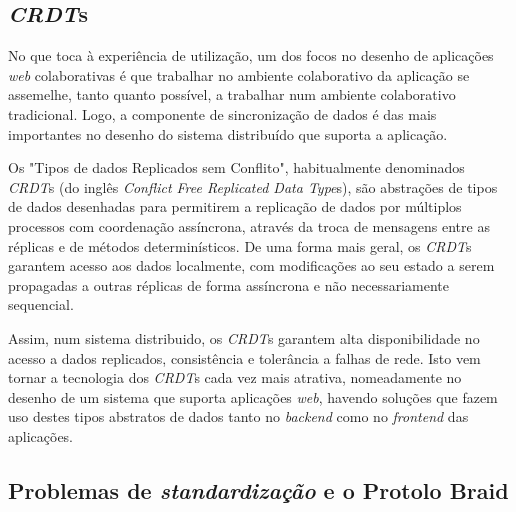 \documentclass[runningheads]{llncs}
\begin{document}


        \subsection{{\itshape CRDT}s}

        No que toca à experiência de utilização, um dos focos no desenho de
        aplicações {\itshape web} colaborativas é que trabalhar no ambiente
        colaborativo da aplicação se assemelhe, tanto quanto possível, a
        trabalhar num ambiente colaborativo tradicional. Logo, a componente de
        sincronização de dados é das mais importantes no desenho do sistema
        distribuído que suporta a aplicação. 

        Os "Tipos de dados Replicados sem Conflito", habitualmente denominados
        {\itshape CRDT}s (do inglês {\itshape Conflict Free Replicated Data
        Type}s), são abstrações de tipos de dados desenhadas para permitirem a
        replicação de dados por múltiplos processos com coordenação assíncrona,
        através da troca de mensagens entre as réplicas e de métodos
        determinísticos\cite{CRDTs}. De uma forma mais geral, os {\itshape
        CRDT}s garantem acesso aos dados localmente, com modificações ao seu
        estado a serem propagadas a outras réplicas de forma assíncrona e não
        necessariamente sequencial.

        Assim, num sistema distribuido, os {\itshape CRDT}s garantem alta
        disponibilidade no acesso a dados replicados, consistência e tolerância
        a falhas de rede. Isto vem tornar a tecnologia dos {\itshape CRDT}s cada
        vez mais atrativa, nomeadamente no desenho de um sistema que suporta
        aplicações {\itshape web}, havendo soluções que fazem uso destes tipos
        abstratos de dados tanto no {\itshape backend} como no {\itshape
        frontend} das aplicações.

        \subsection{Problemas de {\itshape standardização} e o Protolo Braid}
        
\end{document}
